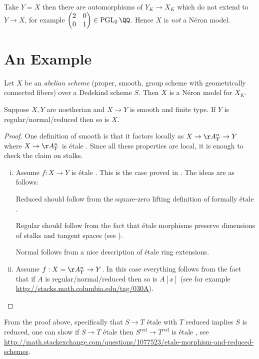 \documentclass[11pt]{article}
\newcommand{\neron}{N\'{e}ron }
\newcommand{\etale}{\'{e}tale }
\begin{document}
Take $Y = X$ then there are automorphisms of $Y_K \to X_K$ which do not extend to $Y \to X$, for example $\begin{pmatrix}2 & 0 \\ 0 & 1\end{pmatrix} \in \operatorname{PGL}_2\QQ$. Hence $X$ is \emph{not} a \neron model.

\section{An Example}

\begin{prop}\label{asareneronmodel}
	Let $X$ be an \emph{abelian scheme} (proper, smooth, group scheme with geometrically connected fibers) over a Dedekind scheme $S$. Then $X$ is a \neron model for $X_K$.
\end{prop}

\begin{lem}\label{smoothoverregnormred}
	Suppose $X,Y$ are noetherian and $X \to Y$ is smooth and finite type. If $Y$ is regular/normal/reduced then so is $X$.
\end{lem}
\begin{proof}
	One definition of smooth is that it factors locally as $X \to \AA^n_Y \to Y$ where $X \to \AA^n_Y$ is \etale. Since all these properties are local, it is enough to check the claim on stalks.
	\begin{enumerate}[(i)]
		\item Assume $f:X\to Y$ is \etale. This is the case proved in \cite{milneLEC}. The ideas are as follows:
		
		Reduced should follow from the square-zero lifting definition of formally \etale.
		
		Regular should follow from the fact that \etale morphisms preserve dimensions of stalks and tangent spaces (see \cite[4.3.23]{liu2006algebraic}).
		
		Normal follows from a nice description of \etale ring extensions.
		
		\item Assume $f: X = \AA^n_Y \to Y$. In this case everything follows from the fact that if $A$ is regular/normal/reduced then so is $A[x]$ (see for example \url{http://stacks.math.columbia.edu/tag/030A}).
	\end{enumerate}
\end{proof}

\begin{rem}
	From the proof above, specifically that $S \to T$ \etale with $T$ reduced implies $S$ is reduced, one can show if $S \to T$ \etale then $S^{\text{red}} \to T^{\text{red}}$ is \etale, see \url{http://math.stackexchange.com/questions/1077523/etale-morphism-and-reduced-schemes}.
\end{rem}
\end{document}
